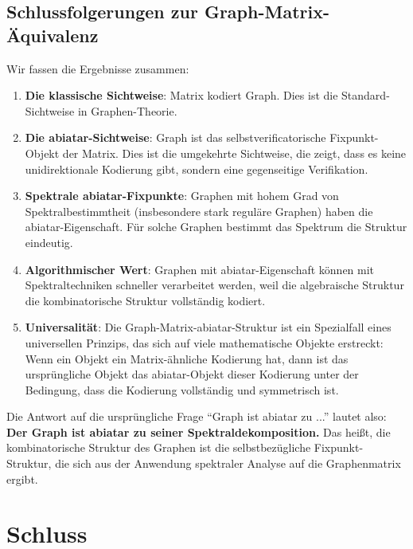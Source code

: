 \documentclass[a4paper,12pt]{article}
\theoremstyle{definition}
\begin{document}
\subsection{Schlussfolgerungen zur Graph-Matrix-Äquivalenz}

Wir fassen die Ergebnisse zusammen:

\begin{enumerate}
\item \textbf{Die klassische Sichtweise}: Matrix kodiert Graph. Dies ist die Standard-Sichtweise in Graphen-Theorie.

\item \textbf{Die abiatar-Sichtweise}: Graph ist das selbstverificatorische Fixpunkt-Objekt der Matrix. Dies ist die umgekehrte Sichtweise, die zeigt, dass es keine unidirektionale Kodierung gibt, sondern eine gegenseitige Verifikation.

\item \textbf{Spektrale abiatar-Fixpunkte}: Graphen mit hohem Grad von Spektralbestimmtheit (insbesondere stark reguläre Graphen) haben die abiatar-Eigenschaft. Für solche Graphen bestimmt das Spektrum die Struktur eindeutig.

\item \textbf{Algorithmischer Wert}: Graphen mit abiatar-Eigenschaft können mit Spektraltechniken schneller verarbeitet werden, weil die algebraische Struktur die kombinatorische Struktur vollständig kodiert.

\item \textbf{Universalität}: Die Graph-Matrix-abiatar-Struktur ist ein Spezialfall eines universellen Prinzips, das sich auf viele mathematische Objekte erstreckt: Wenn ein Objekt ein Matrix-ähnliche Kodierung hat, dann ist das ursprüngliche Objekt das abiatar-Objekt dieser Kodierung unter der Bedingung, dass die Kodierung vollständig und symmetrisch ist.
\end{enumerate}

Die Antwort auf die ursprüngliche Frage ``Graph ist abiatar zu ...'' lautet also: \textbf{Der Graph ist abiatar zu seiner Spektraldekomposition.} Das heißt, die kombinatorische Struktur des Graphen ist die selbstbezügliche Fixpunkt-Struktur, die sich aus der Anwendung spektraler Analyse auf die Graphenmatrix ergibt.

\section{Schluss}
\end{document}
